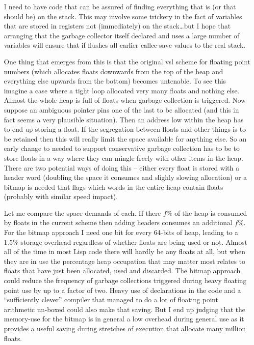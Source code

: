 I need to have code that
can be assured of finding everything that is (or that should be) on the
stack. This may involve some trickery in the fact of variables that are
stored in registers not (immediately) on the stack\ldots but I hope that
arranging that the garbage collector itself declared and uses a large number
of variables will ensure that if flushes all earlier callee-save values
to the real stack.

One thing that emerges from this is that the original {\tx vsl} scheme
for floating point numbers (which allocates floats downwards from the top
of the heap and everything else upwards from the bottom) becomes untenable.
To see this imagine a case where a tight loop allocated very many floats and
nothing else. Almost the whole heap is full of floats when garbage collection
is triggered. Now suppose an ambiguous pointer pins one of the last to be
allocated (and this in fact seems a very plausible situation). Then an
address low within the heap has to end up storing a float. If the
segregation between floats and other things is to be retained then this
will really limit the space available for anything else. So an early
change to {\vsl} needed to support conservative garbage collection has to be
to store floats in a way where they can mingle freely with other items in
the heap. There are two potential ways of doing this -- either every float
is stored with a header word (doubling the space it consumes and
slighly slowing allocation) or a bitmap is needed that flags which words
in the entire heap contain floats (probably with similar speed impact).

Let me compare the space demands of each. If there $f\%$ of the heap is
consumed by floats in the current scheme then adding headers consumes an
additional $f\%$. For the bitmap approach I need one bit for every 64-bits of
heap, leading to a $1.5\%$ storage overhead regardless of whether floats are
being used or not. Almost all of the time in most Lisp code there will hardly
be any floats at all, but when they are in use the percentage heap occupation
that may matter most relates to floats that have just been allocated, used
and discarded. The bitmap approach could reduce the frequency of garbage
collections triggered during heavy floating point use by up to a factor of
two. Heavy use of declarations in the code and a ``sufficiently clever''
compiler that managed to do a lot of floating point arithmetic un-boxed
could also make that saving. But I end up judging that the memory-use for
the bitmap is in general a low overhead during general use as it
provides a useful saving during stretches of execution that allocate
many million floats.

